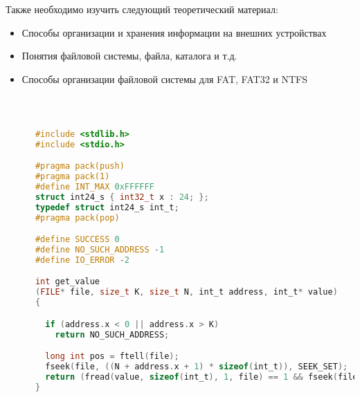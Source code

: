 \documentclass[a4paper,12pt]{article}
\begin{document}
\begin{flushleft}
    Также необходимо изучить следующий теоретический материал:
    \begin{itemize}
      \item Способы организации и хранения информации на внешних устройствах
      \item Понятия файловой системы, файла, каталога и т.д.
      \item Способы организации файловой системы для FAT, FAT32 и NTFS
    \end{itemize}
    
  \end{flushleft}
  
\newpage

  \begin{flushleft}
     \\[0.5em]
    \begin{lstlisting}[language=c, 
                      breaklines=true, 
                      showtabs=false, 
                      showspaces=false, 
                      showstringspaces=false,
                      basicstyle=\ttfamily \footnotesize]
    
      #include <stdlib.h>
      #include <stdio.h>

      #pragma pack(push)
      #pragma pack(1)
      #define INT_MAX 0xFFFFFF
      struct int24_s { int32_t x : 24; };
      typedef struct int24_s int_t;
      #pragma pack(pop)

      #define SUCCESS 0
      #define NO_SUCH_ADDRESS -1
      #define IO_ERROR -2

      int get_value 
      (FILE* file, size_t K, size_t N, int_t address, int_t* value) 
      {

        if (address.x < 0 || address.x > K)
          return NO_SUCH_ADDRESS;

        long int pos = ftell(file);
        fseek(file, ((N + address.x + 1) * sizeof(int_t)), SEEK_SET);
        return (fread(value, sizeof(int_t), 1, file) == 1 && fseek(file, pos, SEEK_SET) == 0) ? SUCCESS : IO_ERROR;
      }
      
    \end{lstlisting}
  \end{flushleft}
\end{document}
